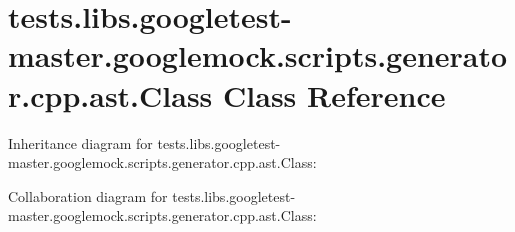 \hypertarget{classtests_1_1libs_1_1googletest-master_1_1googlemock_1_1scripts_1_1generator_1_1cpp_1_1ast_1_1Class}{}\section{tests.\+libs.\+googletest-\/master.googlemock.\+scripts.\+generator.\+cpp.\+ast.\+Class Class Reference}
\label{classtests_1_1libs_1_1googletest-master_1_1googlemock_1_1scripts_1_1generator_1_1cpp_1_1ast_1_1Class}


Inheritance diagram for tests.\+libs.\+googletest-\/master.googlemock.\+scripts.\+generator.\+cpp.\+ast.\+Class\+:


Collaboration diagram for tests.\+libs.\+googletest-\/master.googlemock.\+scripts.\+generator.\+cpp.\+ast.\+Class\+:
